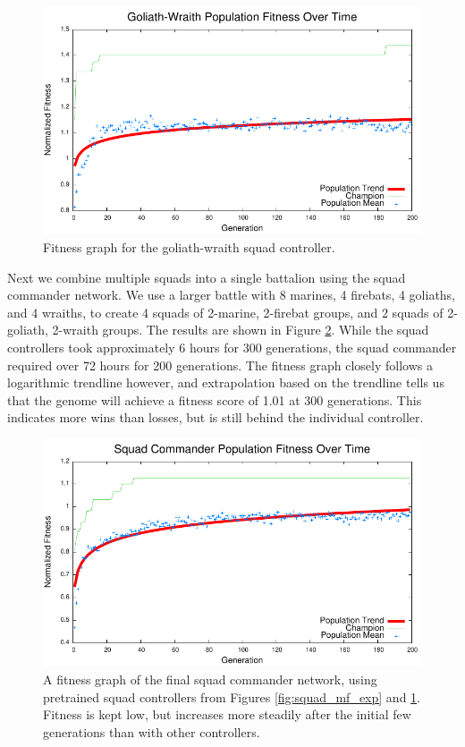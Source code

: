 \documentclass[10pt,a4paper,twocolumn]{article}
\begin{document}
\begin{figure}
\centering
\includegraphics[scale=.59]{plots/squad_gw.pdf}
\caption{Fitness graph for the goliath-wraith squad controller.}
\label{fig:squad_gw_exp}
\end{figure}

Next we combine multiple squads into a single battalion using the squad commander network. We use a larger battle with 8 marines, 4 firebats, 4 goliaths, and 4 wraiths, to create 4 squads of 2-marine, 2-firebat groups, and 2 squads of 2-goliath, 2-wraith groups. The results are shown in Figure \ref{fig:squadcommand_exp}. While the squad controllers took approximately 6 hours for 300 generations, the squad commander required over 72 hours for 200 generations. The fitness graph closely follows a logarithmic trendline however, and extrapolation based on the trendline tells us that the genome will achieve a fitness score of 1.01 at 300 generations. This indicates more wins than losses, but is still behind the individual controller.

\begin{figure}
\centering
\includegraphics[scale=.59]{plots/squadcommand.pdf}
\caption{A fitness graph of the final squad commander network, using pretrained squad controllers from Figures \ref{fig:squad_mf_exp} and \ref{fig:squad_gw_exp}. Fitness is kept low, but increases more steadily after the initial few generations than with other controllers.}
\label{fig:squadcommand_exp}
\end{figure}
\end{document}
